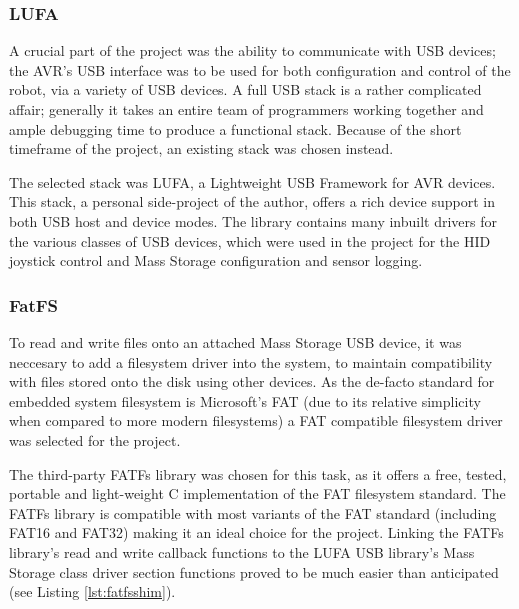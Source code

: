\FloatBarrier
\subsubsection{LUFA}

A crucial part of the project was the ability to communicate with USB devices; the AVR's USB interface was to be used for both configuration and control of the robot, via a variety of USB devices. A full USB stack is a rather complicated affair; generally it takes an entire team of programmers working together and ample debugging time to produce a functional stack. Because of the short timeframe of the project, an existing stack was chosen instead.

The selected stack was LUFA, a Lightweight USB Framework for AVR devices. This stack, a personal side-project of the author, offers a rich device support in both USB host and device modes. The library contains many inbuilt drivers for the various classes of USB devices, which were used in the project for the HID joystick control and Mass Storage configuration and sensor logging.

\FloatBarrier
\subsubsection{FatFS}

To read and write files onto an attached Mass Storage USB device, it was neccesary to add a filesystem driver into the system, to maintain compatibility with files stored onto the disk using other devices. As the de-facto standard for embedded system filesystem is Microsoft's FAT (due to its relative simplicity when compared to more modern filesystems) a FAT compatible filesystem driver was selected for the project.

The third-party FATFs library was chosen for this task, as it offers a free, tested, portable and light-weight C implementation of the FAT filesystem standard. The FATFs library is compatible with most variants of the FAT standard (including FAT16 and FAT32) making it an ideal choice for the project. Linking the FATFs library's read and write callback functions to the LUFA USB library's Mass Storage class driver section functions proved to be much easier than anticipated (see Listing \ref{lst:fatfsshim}).



